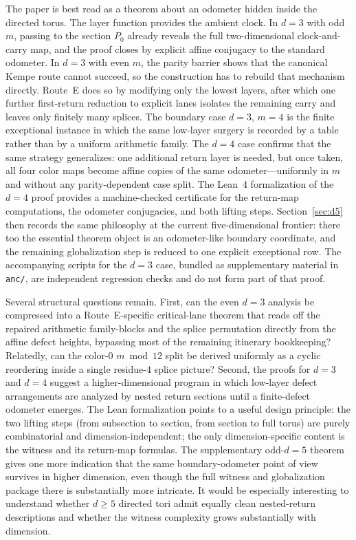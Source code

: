\documentclass[11pt]{article}
\begin{document}
The paper is best read as a theorem about an odometer hidden inside the directed torus.
The layer function provides the ambient clock.
In $d=3$ with odd $m$, passing to the section $P_0$ already reveals the full two-dimensional clock-and-carry map, and the proof closes by explicit affine conjugacy to the standard odometer.
In $d=3$ with even $m$, the parity barrier shows that the canonical Kempe route cannot succeed, so the construction has to rebuild that mechanism directly.
Route~E does so by modifying only the lowest layers, after which one further first-return reduction to explicit lanes isolates the remaining carry and leaves only finitely many splices.
The boundary case $d=3$, $m=4$ is the finite exceptional instance in which the same low-layer surgery is recorded by a table rather than by a uniform arithmetic family.
The $d=4$ case confirms that the same strategy generalizes: one additional return layer is needed, but once taken, all four color maps become affine copies of the same odometer---uniformly in $m$ and without any parity-dependent case split.
The Lean~4 formalization of the $d=4$ proof provides a machine-checked certificate for the return-map computations, the odometer conjugacies, and both lifting steps.
Section~\ref{sec:d5} then records the same philosophy at the current five-dimensional frontier: there too the essential theorem object is an odometer-like boundary coordinate, and the remaining globalization step is reduced to one explicit exceptional row.
The accompanying scripts for the $d=3$ case, bundled as supplementary material in \texttt{anc/}, are independent regression checks and do not form part of that proof.

Several structural questions remain.
First, can the even $d=3$ analysis be compressed into a Route~E-specific critical-lane theorem that reads off the repaired arithmetic family-blocks and the splice permutation directly from the affine defect heights, bypassing most of the remaining itinerary bookkeeping?
Relatedly, can the color-$0$ $m\bmod 12$ split be derived uniformly as a cyclic reordering inside a single residue-$4$ splice picture?
Second, the proofs for $d=3$ and $d=4$ suggest a higher-dimensional program in which low-layer defect arrangements are analyzed by nested return sections until a finite-defect odometer emerges.
The Lean formalization points to a useful design principle: the two lifting steps (from subsection to section, from section to full torus) are purely combinatorial and dimension-independent; the only dimension-specific content is the witness and its return-map formulas.
The supplementary odd-$d=5$ theorem gives one more indication that the same boundary-odometer point of view survives in higher dimension, even though the full witness and globalization package there is substantially more intricate.
It would be especially interesting to understand whether $d\ge 5$ directed tori admit equally clean nested-return descriptions and whether the witness complexity grows substantially with dimension.
\end{document}
